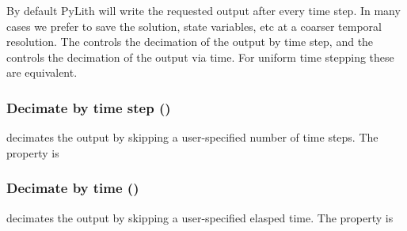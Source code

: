 By default PyLith will write the requested output after every time
step. In many cases we prefer to save the solution, state variables,
etc at a coarser temporal resolution. The 
controls the decimation of the output by time step, and the
 controls the decimation of the output via
time. For uniform time stepping these are equivalent.

\subsubsection{Decimate by time step ()}

 decimates the output by skipping a
user-specified number of time steps. The property is
\begin{inventory}
\end{inventory}

  
\subsubsection{Decimate by time ()}

 decimates the output by skipping a
user-specified elasped time. The property is
\begin{inventory}
\end{inventory}
 
  
